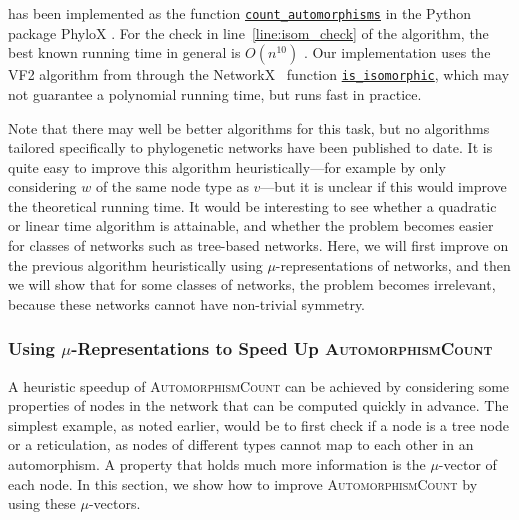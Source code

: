 \documentclass{article}
\theoremstyle{definition}
\begin{document}
 has been implemented as the function \href{https://github.com/RemieJanssen/PhyloX/blob/5dccfd24e0376f9edd7c0695bf4c701a6c8ead52/src/phylox/isomorphism/base.py\#L141C18-L141C19}{\texttt{count\_automorphisms}} in the Python package PhyloX \cite{janssen2024phylox}.
For the check in line~\ref{line:isom_check} of the algorithm, the best known running time in general is $O(n^{10})$ \cite{mena2012ternary}. Our implementation uses the VF2 algorithm from \cite{cordella2001improved} through the NetworkX~\cite{networkx} function \href{https://networkx.org/documentation/stable/reference/algorithms/generated/networkx.algorithms.isomorphism.is_isomorphic.html}{\texttt{is\_isomorphic}}, which may not guarantee a polynomial running time, but runs fast in practice.

Note that there may well be better algorithms for this task, but no algorithms tailored specifically to phylogenetic networks have been published to date. It is quite easy to improve this algorithm heuristically---for example by only considering $w$ of the same node type as $v$---but it is unclear if this would improve the theoretical running time. It would be interesting to see whether a quadratic or linear time algorithm is attainable, and whether the problem becomes easier for classes of networks such as tree-based networks. Here, we will first improve on the previous algorithm heuristically using $\mu$-representations of networks, and then we will show that for some classes of networks, the problem becomes irrelevant, because these networks cannot have non-trivial symmetry.

\subsubsection{Using \texorpdfstring{$\mu$}{mu}-Representations to Speed Up
{\normalfont\texorpdfstring{\textsc{AutomorphismCount}}{AutomorphismCount}}}
A heuristic speedup of \textsc{AutomorphismCount} can be achieved by considering some properties of nodes in the network that can be computed quickly in advance. The simplest example, as noted earlier, would be to first check if a node is a tree node or a reticulation, as nodes of different types cannot map to each other in an automorphism. A property that holds much more information is the $\mu$-vector of each node. In this section, we show how to improve \textsc{AutomorphismCount} by using these $\mu$-vectors.
\end{document}
